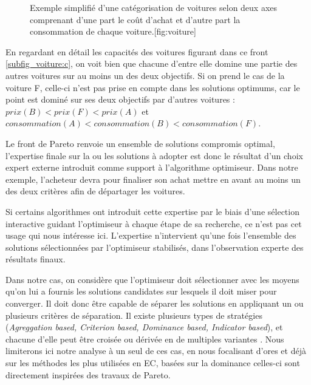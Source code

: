 \begin{figure}[htbp]
	\begin{sidecaption}{Exemple simplifié d'une catégorisation de voitures selon deux axes comprenant d'une part le coût d'achat et d'autre part la consommation de chaque voiture.}[fig:voiture]
	\centering
	  \qquad
 \end{sidecaption}
\end{figure}

\sloppy En regardant en détail les capacités des voitures figurant dans ce front \ref{subfig_voiture:c}, on voit bien que chacune d'entre elle domine une partie des autres voitures sur au moins un des deux objectifs. Si on prend le cas de la voiture F, celle-ci n'est pas prise en compte dans les solutions optimums, car le point est dominé sur ses deux objectifs par d'autres voitures : $ prix(B) < prix(F) < prix(A) $ et $consommation(A) < consommation (B) < consommation(F)$.

Le front de Pareto renvoie un ensemble de solutions compromis optimal, l'expertise finale sur la ou les solutions à adopter est donc le résultat d'un choix expert externe introduit comme support à l'algorithme optimiseur. Dans notre exemple, l'acheteur devra pour finaliser son achat mettre en avant au moins un des deux critères afin de départager les voitures.

Si certains algorithmes ont introduit cette expertise par le biais d'une sélection interactive guidant l'optimiseur à chaque étape de sa recherche, ce n'est pas cet usage qui nous intéresse ici. L'expertise n'intervient qu'une fois l'ensemble des solutions sélectionnées par l'optimiseur stabilisés, dans l'observation experte des résultats finaux.

Dans notre cas, on considère que l'optimiseur doit sélectionner avec les moyens qu'on lui a fournis les solutions candidates sur lesquels il doit miser pour converger. Il doit donc être capable de séparer les solutions en appliquant un ou plusieurs critères de séparation. Il existe plusieurs types de stratégies (\textit{Agreggation based, Criterion based, Dominance based, Indicator based}), et chacune d'elle peut être croisée ou dérivée en de multiples variantes \autocites[28]{Zitzler1999a, Deb2001}[7]{Liefooghe2009}. Nous limiterons ici notre analyse à un seul de ces cas, en nous focalisant d'ores et déjà sur les méthodes les plus utilisées en EC, basées sur la dominance celles-ci sont directement inspirées des travaux de Pareto.

